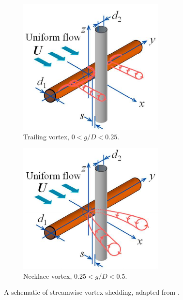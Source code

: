 \documentclass[oneside]{utmthesis}
\begin{document}
\begin{figure}[!h]
  \centering
  \begin{subfigure}[h]{0.45\textwidth}
    \includegraphics[width=\textwidth]{figs/streamwiseTrailing}
    \caption{Trailing vortex, $0 < g/D < 0.25$.}
    \label{fig:streamTrail}
  \end{subfigure}
  \hspace{1cm}
  \begin{subfigure}[h]{0.45\textwidth}
    \includegraphics[width=\textwidth]{figs/streamwiseNecklace}
    \caption{Necklace vortex, $0.25 < g/D < 0.5$.}
    \label{fig:streamNecklace}
  \end{subfigure}

  \caption{A schematic of streamwise vortex shedding, adapted from \citet{Hemsuwan2018a}.} \label{fig:streamwiseFigure}
\end{figure}
\end{document}
